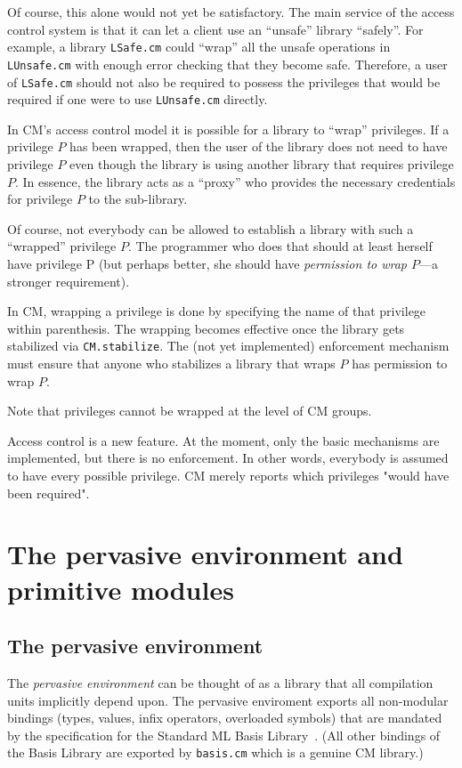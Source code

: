 \documentclass{article}
\begin{document}
Of course, this alone would not yet be satisfactory.  The main service
of the access control system is that it can let a client use an
``unsafe'' library ``safely''.  For example, a library {\tt LSafe.cm}
could ``wrap'' all the unsafe operations in {\tt LUnsafe.cm} with
enough error checking that they become safe.  Therefore, a user of
{\tt LSafe.cm} should not also be required to possess the privileges
that would be required if one were to use {\tt LUnsafe.cm} directly.

In CM's access control model it is possible for a library to ``wrap''
privileges.  If a privilege $P$ has been wrapped, then the user of the
library does not need to have privilege $P$ even though the library is
using another library that requires privilege $P$.  In essence, the
library acts as a ``proxy'' who provides the necessary credentials for
privilege $P$ to the sub-library.

Of course, not everybody can be allowed to establish a library with
such a ``wrapped'' privilege $P$.  The programmer who does that should at
least herself have privilege P (but perhaps better, she should have
{\em permission to wrap $P$}---a stronger requirement).

In CM, wrapping a privilege is done by specifying the name of that
privilege within parenthesis.  The wrapping becomes effective once the
library gets stabilized via {\tt CM.stabilize}.  The (not yet
implemented) enforcement mechanism must ensure that anyone who
stabilizes a library that wraps $P$ has permission to wrap $P$.

Note that privileges cannot be wrapped at the level of CM groups.

Access control is a new feature. At the moment, only the basic
mechanisms are implemented, but there is no enforcement.  In other
words, everybody is assumed to have every possible privilege.  CM
merely reports which privileges "would have been required".

\section{The pervasive environment and primitive modules}

\subsection{The pervasive environment}

The {\em pervasive environment} can be thought of as a library that
all compilation units implicitly depend upon.  The pervasive
enviroment exports all non-modular bindings (types, values, infix
operators, overloaded symbols) that are mandated by the specification
for the Standard ML Basis Library~\cite{reppy99:basis}.  (All other
bindings of the Basis Library are exported by {\tt basis.cm} which is
a genuine CM library.)
\end{document}
